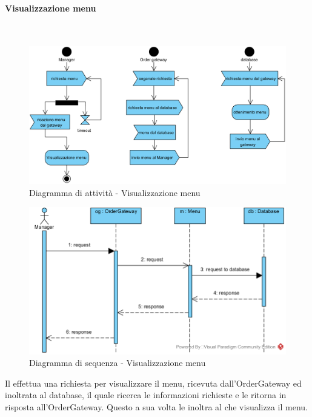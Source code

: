 \subsubsection{\Manager{}}

\begin{samepage}
\paragraph{Visualizzazione menu}\mbox{}\\
\begin{figure}[H]
	\centering
	\includegraphics[width=14cm]{diagrammi_img/attivita/manager_get_menu.png}
	\caption{Diagramma di attività - Visualizzazione menu}
\end{figure}
\end{samepage}
\begin{figure}[H]
	\centering
	\includegraphics[width=14cm]{../../documenti/SpecificaTecnica/diagrammi_img/sequenza/direttore_visualizza_menu.png}
	\caption{Diagramma di sequenza - Visualizzazione menu}
\end{figure}
Il \Manager{} effettua una richiesta per visualizzare il menu, ricevuta dall'Order\-Gateway ed inoltrata al database, il quale ricerca le informazioni richieste e le ritorna in risposta all'Order\-Gateway. Questo a sua volta le inoltra al \Manager{} che visualizza il menu.

